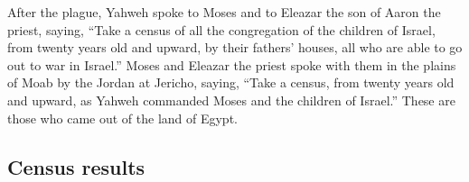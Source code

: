 \begin{paracol}{2}
\begin{otherlanguage}{english}
 After the plague, Yahweh spoke to Moses and to Eleazar
the son of Aaron the priest, saying,  ``Take a census of
all the congregation of the children of Israel, from twenty years old
and upward, by their fathers' houses, all who are able to go out to war
in Israel.''  Moses and Eleazar the priest spoke with them
in the plains of Moab by the Jordan at Jericho, saying, 
``Take a census, from twenty years old and upward, as Yahweh commanded
Moses and the children of Israel.'' These are those who came out of the
land of Egypt.

\hypertarget{census-results-1}{%
\subsection{Census results}\label{census-results-1}}


\end{otherlanguage}
\end{paracol}
